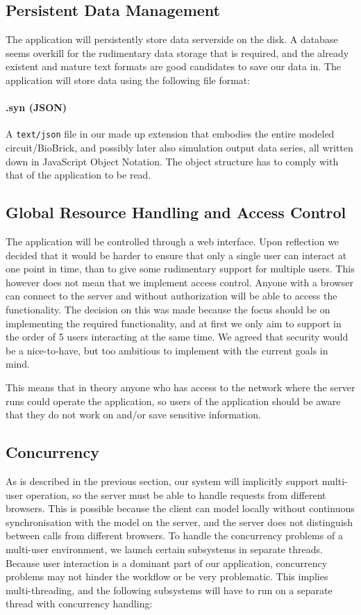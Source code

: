 \subsection{Persistent Data Management}
\label{ss-persitance}
The application will persistently store data serverside on the disk. A database seems overkill for the rudimentary data storage that is required, and the already existent and mature text formats are good candidates to save our data in. The application will store data using the following file format:

\paragraph{.syn (JSON)}
A \verb=text/json= file in our made up extension
that embodies the entire modeled circuit/BioBrick, and possibly later also simulation output data series, all written down in JavaScript Object Notation. The object structure has to comply with that of the application to be read.


\subsection{Global Resource Handling and Access Control}
The application will be controlled through a web interface. Upon reflection we decided that it would be harder to ensure that only a single user can interact at one point in time, than to give some rudimentary support for multiple users. This however does not mean that we implement access control. Anyone with a browser can connect to the server and without authorization will be able to access the functionality. The decision on this was made because the focus should be on implementing the required functionality, and at first we only aim to support in the order of 5 users interacting at the same time. We agreed that security  would be a nice-to-have, but too ambitious to implement with the current goals in mind.

This means that in theory anyone who has access to the network where the server runs could operate the application, so users of the application should be aware that they do not work on and/or save sensitive information.

\pagebreak
\subsection{Concurrency}
As is described in the previous section, our system will implicitly support multi-user operation, so the server must be able to handle requests from different browsers. This is possible because the client can model locally without continuous synchronisation with the model on the server, and the server does not distinguish between calls from different browsers. To handle the concurrency problems of a multi-user environment, we launch certain subsystems in separate threads. Because user interaction is a dominant part of our application, concurrency problems may not hinder the workflow or be very problematic. This implies multi-threading, and the following subsystems will have to run on a separate thread with concurrency handling:

